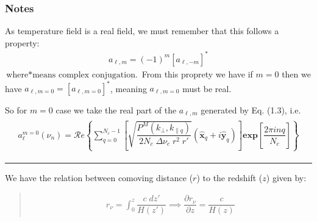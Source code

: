 \documentclass[a4paper,11pt,oneside,english,openany]{sphinxmanual}
\begin{document}
\subsubsection*{Notes}

\sphinxAtStartPar
As temperature field is a real field, we must remember that this follows a property:
\begin{equation*}
\begin{split}\boxed{a_{\ell, m} = (-1)^{m} [a_{\ell, -m}]^{*}}\end{split}
\end{equation*}
\sphinxAtStartPar
\(\text{where} * \text{means complex conjugation.}\) From this proprety we have if \(m=0\) then we have \(a_{\ell, m=0} = [a_{\ell, m=0}]^{*}\), meaning \(a_{\ell, m=0}\) must be real.

\sphinxAtStartPar
So for \(m=0\) case we take the real part of the \(a_{\ell, m}\) generated by Eq. (1.3), i.e.
\begin{equation*}
\begin{split}\begin{align}
a_{\ell}^{m=0}(\nu_n) ={\mathcal Re}\left\{ \sum_{q=0}^{N_c- 1} \left[
\sqrt{\dfrac{P^M(k_\perp, k_{\parallel q})}{2N_c\;\Delta{\nu_c }\;r^2\;r'}}
\left({\hat{\mathbf{x}}_q + i \hat{\mathbf{y}}_q} \right)
\right] {\textbf{exp}}\left[{\dfrac{2\pi i n q}{N_c}}\right]\right\}
\end{align}\end{split}
\end{equation*}

\bigskip\hrule\bigskip


\sphinxAtStartPar
We have the relation between co\sphinxhyphen{}moving distance (\(r\)) to the red\sphinxhyphen{}shift (\(z\)) given by:
\begin{quote}
\begin{equation*}
\begin{split}r_{\nu}=\int_{0}^{z} \dfrac{c\;dz'}{H(z')} \implies \dfrac{\partial r_{\nu}}{\partial z} = \dfrac{c}{H(z)}\end{split}
\end{equation*}\end{quote}
\end{document}
